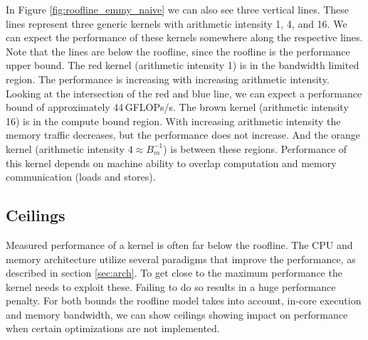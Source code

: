 In Figure \ref{fig:roofline_emmy_naive} we can also see three vertical lines. These lines represent three generic kernels with arithmetic intensity 1, 4, and 16. We can expect the performance of these kernels somewhere along the respective lines.
Note that the lines are below the roofline, since the roofline is the performance upper bound.
The red kernel (arithmetic intensity 1) is in the bandwidth limited region. The performance is increasing with increasing arithmetic intensity. Looking at the intersection of the red and blue line, we can expect a performance bound of approximately 44\,GFLOPs/s.
The brown kernel (arithmetic intensity 16) is in the compute bound region. With increasing arithmetic intensity the memory traffic decreases, but the performance does not increase.
And the orange kernel (arithmetic intensity $4 \approx B_m^{-1}$) is between these regions. Performance of this kernel depends on machine ability to overlap computation and memory communication (loads and stores).



\subsection{Ceilings}

Measured performance of a kernel is often far below the roofline. The CPU and memory architecture utilize several paradigms that improve the performance, as described in section \ref{sec:arch}. To get close to the maximum performance the kernel needs to exploit these. Failing to do so results in a huge performance penalty.
For both bounds the roofline model takes into account, in-core execution and memory bandwidth, we can show ceilings showing impact on performance when certain optimizations are not implemented.

